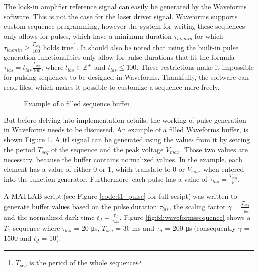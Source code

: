 The lock-in amplifier reference signal can easily be generated by the Waveforms software. This is not the case for the laser driver signal. Waveforms supports custom sequence programming, however the system for writing these sequences only allows for pulses, which have a minimum duration $\tau_{las min}$ for which $\tau_{las min} \geq \frac{T_{seq}}{100}$ holds true\footnote{$T_{seq}$ is the period of the whole sequence}. It should also be noted that using the built-in pulse generation functionalities only allow for pulse durations that fit the formula $\tau_{las} = t_{las}\frac{T_{seq}}{100}$, where $t_{las} \in \mathbb{Z}^+$ and $t_{las} \leq 100$. These restrictions make it impossible for pulsing sequences to be designed in Waveforms. Thankfully, the software can read files, which makes it possible to customize a sequence more freely.


\begin{figure}[ht]
	\centering
	\caption{Example of a filled sequence buffer}
	\label{fig:td:driver:working_principle}
\end{figure}

But before delving into implementation details, the working of pulse generation in Waveforms needs to be discussed. An example of a filled Waveforms buffer, is shown Figure \ref{fig:td:driver:working_principle}. A \gls{ttl} signal can be generated using the values from it by setting the period $T_{seq}$ of the sequence and the peak voltage $V_{max}$. Those two values are necessary, because the buffer contains normalized values. In the example, each element has a value of either 0 or 1, which translate to 0 or $V_{max}$ when entered into the function generator. Furthermore, each pulse has a value of $\tau_{las} = \frac{T_{seq}}{5}$.

A MATLAB script (see Figure \ref{code:t1_pulse} for full script) was written to generate buffer values based on the pulse duration $\tau_{las}$, the scaling factor $\gamma = \frac{T_{seq}}{\tau_{las}}$ and the normalized dark time $t_d = \frac{\tau_{d}}{\tau_{las}}$. Figure \ref{fig:fd:waveformssequence} shows a $T_1$ sequence where $\tau_{las}$ = 20 \unit{\micro\second}, $T_{seq}$ = 30 \unit{\milli\second} and $\tau_{d}$ = 200 \unit{\micro\second} (consequently $\gamma$ = 1500 and $t_d$ = 10). 

